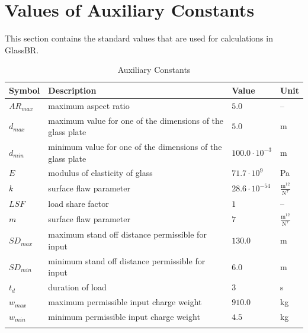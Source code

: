 \documentclass[12pt]{article}
\begin{document}
\section{Values of Auxiliary Constants}
\label{Sec:AuxConstants}
This section contains the standard values that are used for calculations in GlassBR.
\begin{longtabu}{l X[l] l l}
\toprule
Symbol & Description & Value & Unit
\\
\midrule
\endhead
${AR_{max}}$ & maximum aspect ratio & $5.0$ & --
\\
${d_{max}}$ & maximum value for one of the dimensions of the glass plate & $5.0$ & m
\\
${d_{min}}$ & minimum value for one of the dimensions of the glass plate & $100.0\cdot{}10^{-3}$ & m
\\
$E$ & modulus of elasticity of glass & $71.7\cdot{}10^{9}$ & Pa
\\
$k$ & surface flaw parameter & $28.6\cdot{}10^{-54}$ & $\frac{\text{m}^{12}}{\text{N}^{7}}$
\\
$LSF$ & load share factor & $1$ & --
\\
$m$ & surface flaw parameter & $7$ & $\frac{\text{m}^{12}}{\text{N}^{7}}$
\\
${SD_{max}}$ & maximum stand off distance permissible for input & $130.0$ & m
\\
${SD_{min}}$ & minimum stand off distance permissible for input & $6.0$ & m
\\
${t_{d}}$ & duration of load & $3$ & s
\\
${w_{max}}$ & maximum permissible input charge weight & $910.0$ & kg
\\
${w_{min}}$ & minimum permissible input charge weight & $4.5$ & kg
\\
\bottomrule
\caption{Auxiliary Constants}
\label{Table:TAuxConsts}
\end{longtabu}
\end{document}
